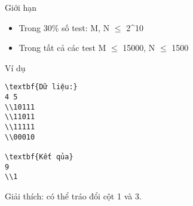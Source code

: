 Giới hạn
\begin{itemize}
	\item     Trong 30\% số test: M, N  $\le$  2^10   
	\item     Trong tất cả các test M  $\le$  15000, N  $\le$  1500   
\end{itemize}
Ví dụ
\begin{verbatim}
\textbf{Dữ liệu:}
4 5
\\10111
\\11011
\\11111
\\00010

\textbf{Kết qủa}
9
\\1
\end{verbatim}

   Giải thích: có thể tráo đổi cột 1 và 3.